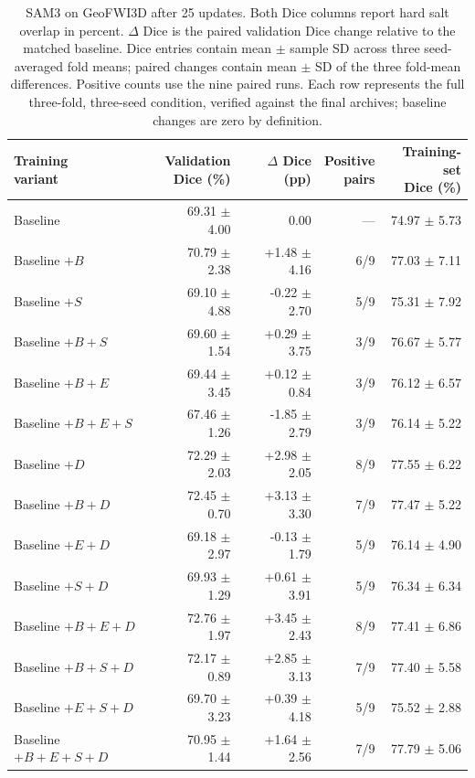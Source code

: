\documentclass[12pt,a4paper]{article}
\begin{document}
\begin{table}[htbp]
\centering\small{}
\setlength{\tabcolsep}{6pt}
\renewcommand{\arraystretch}{1.12}
\begin{tabular}{@{}lrrrr@{}}
\hline
\shortstack{Training\\variant} & \shortstack{Validation\\Dice (\%)} & \shortstack{$\Delta$ Dice\\(pp)} & \shortstack{Positive\\pairs} & \shortstack{Training-set\\Dice (\%)} \\
\hline
Baseline & 69.31 $\pm$ 4.00 & 0.00 & --- & 74.97 $\pm$ 5.73 \\
Baseline $+B$ & 70.79 $\pm$ 2.38 & +1.48 $\pm$ 4.16 & 6/9 & 77.03 $\pm$ 7.11 \\
Baseline $+S$ & 69.10 $\pm$ 4.88 & -0.22 $\pm$ 2.70 & 5/9 & 75.31 $\pm$ 7.92 \\
Baseline $+B+S$ & 69.60 $\pm$ 1.54 & +0.29 $\pm$ 3.75 & 3/9 & 76.67 $\pm$ 5.77 \\
Baseline $+B+E$ & 69.44 $\pm$ 3.45 & +0.12 $\pm$ 0.84 & 3/9 & 76.12 $\pm$ 6.57 \\
Baseline $+B+E+S$ & 67.46 $\pm$ 1.26 & -1.85 $\pm$ 2.79 & 3/9 & 76.14 $\pm$ 5.22 \\
Baseline $+D$ & 72.29 $\pm$ 2.03 & +2.98 $\pm$ 2.05 & 8/9 & 77.55 $\pm$ 6.22 \\
Baseline $+B+D$ & 72.45 $\pm$ 0.70 & +3.13 $\pm$ 3.30 & 7/9 & 77.47 $\pm$ 5.22 \\
Baseline $+E+D$ & 69.18 $\pm$ 2.97 & -0.13 $\pm$ 1.79 & 5/9 & 76.14 $\pm$ 4.90 \\
Baseline $+S+D$ & 69.93 $\pm$ 1.29 & +0.61 $\pm$ 3.91 & 5/9 & 76.34 $\pm$ 6.34 \\
Baseline $+B+E+D$ & 72.76 $\pm$ 1.97 & +3.45 $\pm$ 2.43 & 8/9 & 77.41 $\pm$ 6.86 \\
Baseline $+B+S+D$ & 72.17 $\pm$ 0.89 & +2.85 $\pm$ 3.13 & 7/9 & 77.40 $\pm$ 5.58 \\
Baseline $+E+S+D$ & 69.70 $\pm$ 3.23 & +0.39 $\pm$ 4.18 & 5/9 & 75.52 $\pm$ 2.88 \\
Baseline $+B+E+S+D$ & 70.95 $\pm$ 1.44 & +1.64 $\pm$ 2.56 & 7/9 & 77.79 $\pm$ 5.06 \\
\hline
\end{tabular}
\caption{SAM3 on GeoFWI3D after 25 updates. Both Dice columns report
hard salt overlap in percent. $\Delta$ Dice is the paired validation
Dice change relative to the matched baseline. Dice entries contain mean
$\pm$ sample SD across three seed-averaged fold means; paired changes
contain mean $\pm$ SD of the three fold-mean differences. Positive counts
use the nine paired runs. Each row represents the full three-fold,
three-seed condition, verified against the final archives;
baseline changes are zero by definition.}
\label{tab:sam3-geo-results}
\end{table}
\end{document}
